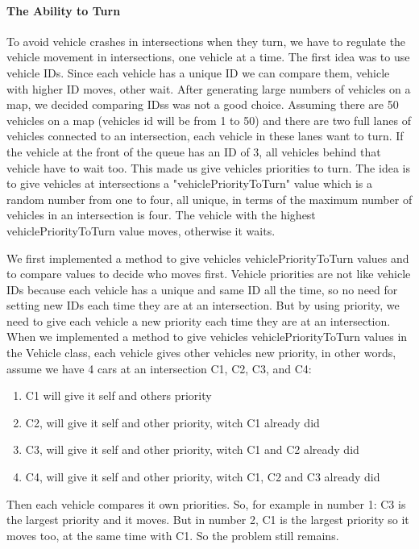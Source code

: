\documentclass[a4paper,11pt,titlepage]{article}
\begin{document}
\paragraph{The Ability to Turn}
To avoid vehicle crashes in intersections when they turn, we have to regulate the vehicle movement in intersections, one vehicle at a time. The first idea was to use vehicle IDs. Since each vehicle has a unique ID we can compare them, vehicle with higher ID moves, other wait. After generating large numbers of vehicles on a map, we decided comparing IDss was not a good choice. Assuming there are 50 vehicles on a map (vehicles id will be from 1 to 50) and there are two full lanes of vehicles connected to an intersection, each vehicle in these lanes want to turn. If the vehicle at the front of the queue has an ID of 3, all vehicles behind that vehicle have to wait too. This made us give vehicles priorities to turn. The idea is to give vehicles at intersections a "vehiclePriorityToTurn" value which is a random number from one to four, all unique, in terms of the maximum number of vehicles in an intersection is four. The vehicle with the highest vehiclePriorityToTurn value moves, otherwise it waits.

We first implemented a method to give vehicles vehiclePriorityToTurn values and to compare values to decide who moves first. Vehicle priorities are not like vehicle IDs because each vehicle has a unique and same ID all the time, so no need for setting new IDs each time they are at an intersection. But by using priority, we need to give each vehicle a new priority each time they are at an intersection. When we implemented a method to give vehicles vehiclePriorityToTurn values in the Vehicle class, each vehicle gives other vehicles new priority, in other words, assume we have 4 cars at an intersection C1, C2, C3, and C4: 
\begin{enumerate}\itemsep1pt \parskip0pt 
\item C1 will give it self and others priority
\item C2, will give it self and other priority, witch C1 already did
\item C3, will give it self and other priority, witch C1 and C2 already did
\item C4, will give it self and other priority, witch C1, C2 and C3 already did
\end{enumerate}
Then each vehicle compares it own priorities. So, for example in number 1: C3 is the largest priority and it moves. But in number 2, C1 is the largest priority so it moves too, at the same time with C1. So the problem still remains.
\end{document}
